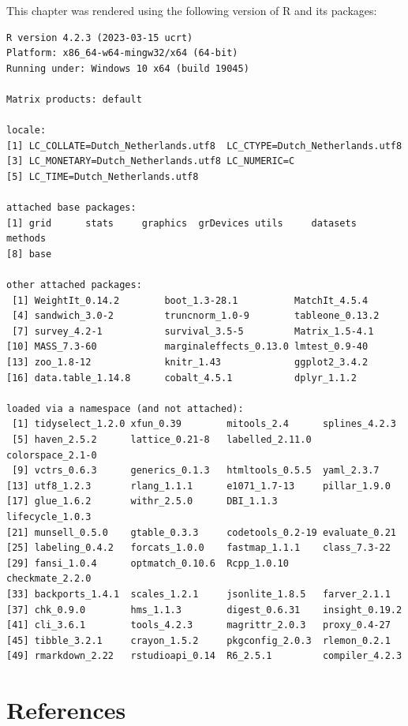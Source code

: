 \documentclass[
  letterpaper,
  DIV=11,
  numbers=noendperiod]{scrreprt}
\begin{document}
This chapter was rendered using the following version of R and its
packages:

\begin{verbatim}
R version 4.2.3 (2023-03-15 ucrt)
Platform: x86_64-w64-mingw32/x64 (64-bit)
Running under: Windows 10 x64 (build 19045)

Matrix products: default

locale:
[1] LC_COLLATE=Dutch_Netherlands.utf8  LC_CTYPE=Dutch_Netherlands.utf8   
[3] LC_MONETARY=Dutch_Netherlands.utf8 LC_NUMERIC=C                      
[5] LC_TIME=Dutch_Netherlands.utf8    

attached base packages:
[1] grid      stats     graphics  grDevices utils     datasets  methods  
[8] base     

other attached packages:
 [1] WeightIt_0.14.2        boot_1.3-28.1          MatchIt_4.5.4         
 [4] sandwich_3.0-2         truncnorm_1.0-9        tableone_0.13.2       
 [7] survey_4.2-1           survival_3.5-5         Matrix_1.5-4.1        
[10] MASS_7.3-60            marginaleffects_0.13.0 lmtest_0.9-40         
[13] zoo_1.8-12             knitr_1.43             ggplot2_3.4.2         
[16] data.table_1.14.8      cobalt_4.5.1           dplyr_1.1.2           

loaded via a namespace (and not attached):
 [1] tidyselect_1.2.0 xfun_0.39        mitools_2.4      splines_4.2.3   
 [5] haven_2.5.2      lattice_0.21-8   labelled_2.11.0  colorspace_2.1-0
 [9] vctrs_0.6.3      generics_0.1.3   htmltools_0.5.5  yaml_2.3.7      
[13] utf8_1.2.3       rlang_1.1.1      e1071_1.7-13     pillar_1.9.0    
[17] glue_1.6.2       withr_2.5.0      DBI_1.1.3        lifecycle_1.0.3 
[21] munsell_0.5.0    gtable_0.3.3     codetools_0.2-19 evaluate_0.21   
[25] labeling_0.4.2   forcats_1.0.0    fastmap_1.1.1    class_7.3-22    
[29] fansi_1.0.4      optmatch_0.10.6  Rcpp_1.0.10      checkmate_2.2.0 
[33] backports_1.4.1  scales_1.2.1     jsonlite_1.8.5   farver_2.1.1    
[37] chk_0.9.0        hms_1.1.3        digest_0.6.31    insight_0.19.2  
[41] cli_3.6.1        tools_4.2.3      magrittr_2.0.3   proxy_0.4-27    
[45] tibble_3.2.1     crayon_1.5.2     pkgconfig_2.0.3  rlemon_0.2.1    
[49] rmarkdown_2.22   rstudioapi_0.14  R6_2.5.1         compiler_4.2.3  
\end{verbatim}

\hypertarget{references}{%
\section*{References}\label{references}}
\end{document}
